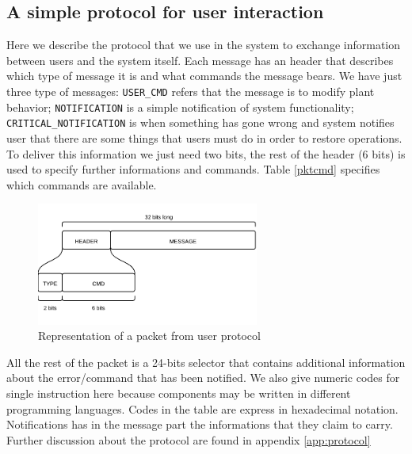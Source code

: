 \documentclass[10pt,a4paper]{report}
\begin{document}
\subsection{A simple protocol for user interaction}
Here we describe the protocol that we use in the system to exchange 
information between users and the system itself. Each message has an header that 
describes which type of message it is and what commands the message bears. We 
have just three type of messages: \texttt{USER\_CMD} refers that the 
message is to modify plant behavior; \texttt{NOTIFICATION} is a simple 
notification of system functionality; \texttt{CRITICAL\_NOTIFICATION} is 
when something has gone wrong and system notifies user that there are some 
things that users must do in order to restore operations. To deliver this
information we just need two bits, the rest of the header (6 bits) is used 
to specify further informations and commands. Table \ref{pktcmd} specifies
which commands are available.  
\begin{figure}[h!tb]
\centering
\includegraphics[width=0.65\textwidth]{images/Protocol}
\caption{Representation of a packet from user protocol}
\end{figure}
All the rest of the packet is a 24-bits selector that contains additional 
information about the error/command that has been notified.
We also give numeric codes for single instruction here because components may be 
written in different programming languages. Codes in the table are express in 
hexadecimal notation. Notifications has in the message part the informations that
they claim to carry. Further discussion about the protocol are found in appendix
\ref{app:protocol}
\end{document}
